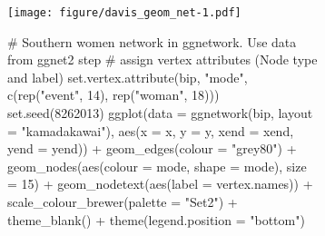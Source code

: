 \begin{figure}
\ContinuedFloat
\begin{subfigure}[t]{\textwidth}
\caption{}


             \begin{adjustbox}{valign=t}

             \begin{minipage}{.49\textwidth}
{\footnotesize
{} 
}
                   \end{minipage}

                  \begin{minipage}{.49\textwidth}

\texttt{[image: figure/davis\_geom\_net-1.pdf]}

                          \end{minipage}

                          \end{adjustbox}
\end{subfigure}
\begin{subfigure}[t]{\textwidth}
\caption{}


             \begin{adjustbox}{valign=t}

             \begin{minipage}{.49\textwidth}
{\footnotesize             
\begin{example}
# Southern women network in ggnetwork. Use data from ggnet2 step
# assign vertex attributes (Node type and label)
set.vertex.attribute(bip, "mode", 
  c(rep("event", 14), rep("woman", 18)))
set.seed(8262013)
ggplot(data = ggnetwork(bip, 
        layout = "kamadakawai"),
    aes(x = x, y = y, xend = xend, yend = yend)) + 
  geom_edges(colour = "grey80") +
  geom_nodes(aes(colour = mode, shape = mode), 
             size = 15) +
  geom_nodetext(aes(label = vertex.names)) +
  scale_colour_brewer(palette = "Set2") +
  theme_blank() + 
  theme(legend.position = "bottom") 
\end{example} 
}
                   \end{minipage}


\end{adjustbox}
\end{subfigure}
\end{figure}
